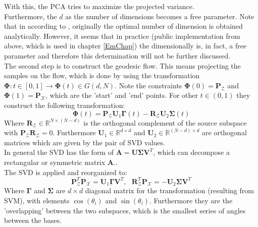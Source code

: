 With this, the \acs{PCA} tries to maximize the projected variance.\cite[p.561-563]{Bishop.2009}\\
Furthermore, the $d$ as the number of dimensions becomes a free parameter.
Note that in according to \cite{Gong.}, originally the optimal number of dimension is obtained analytically.
However, it seems that in practice (public implementation from above, which is used in chapter \ref{EmChap}) the dimensionally is, in fact, a free parameter and therefore this determination will not be further discussed.\\
The second step is to construct the geodesic flow.
This means projecting the samples on the flow, which is done by using the transformation $\boldsymbol{\Phi}:t\in [0,1] \to \boldsymbol{\Phi}(t) \in G(d,N)$.
Note the constraints $\boldsymbol{\Phi}(0) = \mathbf{P}_\mathcal{Z}$ and $\boldsymbol{\Phi}(1)=\mathbf{P}_\mathcal{X}$, which are the 'start' and 'end' points.
For other $t \in (0,1) $ they construct the following transformation:\cite{Gong.}
\begin{equation}\label{EqGFKTransformation}
	\boldsymbol{\Phi}(t) = \mathbf{P}_\mathcal{Z}\mathbf{U}_1\boldsymbol{\Gamma}(t) - \mathbf{R}_\mathcal{Z}\mathbf{U}_2\boldsymbol{\Sigma}(t)
\end{equation}
Where $\mathbf{R}_\mathcal{Z} \in \mathbb{R}^{N\times (N-d)}$ is the orthogonal complement of the source subspace with $\mathbf{P}_\mathcal{Z}\mathbf{R}_\mathcal{Z}=0$.
Furthermore $\mathbf{U}_1 \in \mathbb{R}^{d\times d}$ and $\mathbf{U}_2 \in \mathbb{R}^{(N-d)\times d}$ are orthogonal matrices which are given by the pair of \ac{SVD} values.\cite{Gong.}\\
In general the \acs{SVD} has the form of $\mathbf{A} = \mathbf{U\Sigma V}^T$, which can decompose a rectangular or symmetric matrix $\mathbf{A}$.\cite{Golub.1965}.\\
The \acs{SVD} is applied and reorganized to:
\begin{equation}\label{EqGFKSVDRe}
		\mathbf{P}_\mathcal{Z}^T\mathbf{P}_\mathcal{X} = \mathbf{U}_1\boldsymbol{\Gamma}\mathbf{V}^T,\>\>\> \mathbf{R}_\mathcal{Z}^T\mathbf{P}_\mathcal{X} = -\mathbf{U}_2\boldsymbol{\Sigma}\mathbf{V}^T
\end{equation}
Where $\boldsymbol{\Gamma}$ and $\boldsymbol{\Sigma}$ are $d\times d$ diagonal matrix for the transformation (resulting from \acs{SVM}), with elements $\cos(\theta_i)$ and $\sin(\theta_i)$.
Furthermore they are the 'overlapping' between the two subspaces, which is the smallest series of angles between the bases.\cite{Gong.2015}
